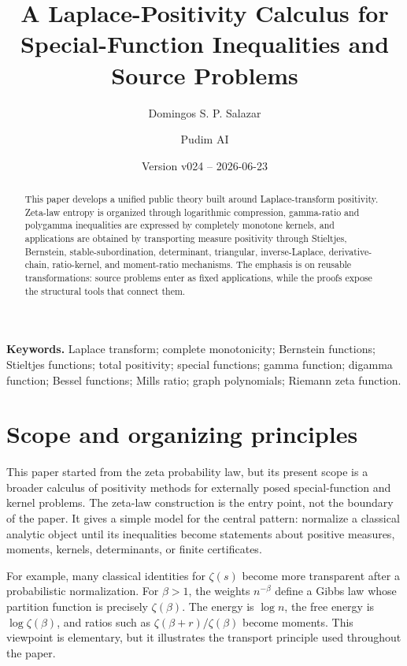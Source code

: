 \documentclass[11pt]{article}
\title{A Laplace-Positivity Calculus for Special-Function Inequalities and Source Problems}
\author{Domingos S. P. Salazar \and Pudim AI}
\date{Version v024 -- 2026-06-23}
\numberwithin{equation}{section}
\theoremstyle{definition}
\theoremstyle{remark}
\newcommand{\1}{\mathbf 1}
\begin{document}
\maketitle

\begin{abstract}
This paper develops a unified public theory built around Laplace-transform
positivity.  Zeta-law entropy is organized through logarithmic compression,
gamma-ratio and polygamma inequalities are expressed by completely monotone
kernels, and applications are obtained by transporting measure positivity
through Stieltjes, Bernstein, stable-subordination, determinant, triangular,
inverse-Laplace, derivative-chain, ratio-kernel, and moment-ratio mechanisms.
The emphasis is on reusable transformations: source problems enter as fixed
applications, while the proofs expose the structural tools that connect them.
\end{abstract}

\tableofcontents

\medskip



\noindent\textbf{Keywords.} Laplace transform; complete monotonicity; Bernstein functions; Stieltjes functions; total positivity; special functions; gamma function; digamma function; Bessel functions; Mills ratio; graph polynomials; Riemann zeta function.

\section{Scope and organizing principles}

This paper started from the zeta probability law, but its present scope is a
broader calculus of positivity methods for externally posed special-function
and kernel problems.  The zeta-law construction is the entry point, not the
boundary of the paper.  It gives a simple model for the central pattern:
normalize a classical analytic object until its inequalities become statements
about positive measures, moments, kernels, determinants, or finite
certificates.

For example, many classical identities for \(\zeta(s)\) become more
transparent after a probabilistic normalization.  For \(\beta>1\), the weights
\(n^{-\beta}\) define a Gibbs law whose partition function is precisely
\(\zeta(\beta)\).  The energy is \(\log n\), the free energy is
\(\log\zeta(\beta)\), and ratios such as
\(\zeta(\beta+r)/\zeta(\beta)\) become moments.  This viewpoint is elementary,
but it illustrates the transport principle used throughout the paper.
\end{document}
